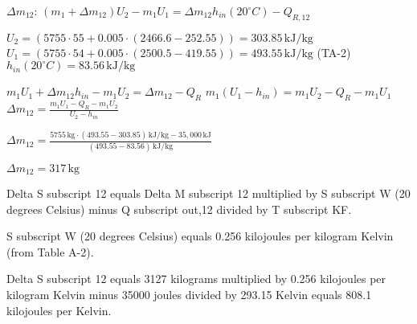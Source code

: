 \( \Delta m_{12} \):  
\((m_1 + \Delta m_{12}) U_2 - m_1 U_1 = \Delta m_{12} h_{in}(20^\circ C) - Q_{R,12}\)  

\( U_2 = (5755 \cdot 55 + 0.005 \cdot (2466.6 - 252.55)) = 303.85 \, \text{kJ/kg}\)  
\( U_1 = (5755 \cdot 54 + 0.005 \cdot (2500.5 - 419.55)) = 493.55 \, \text{kJ/kg}\) (TA-2)  
\( h_{in}(20^\circ C) = 83.56 \, \text{kJ/kg}\)  

\( m_1 U_1 + \Delta m_{12} h_{in} - m_1 U_2 = \Delta m_{12} - Q_{R}\)  
\( m_1 (U_1 - h_{in}) = m_1 U_2 - Q_{R} - m_1 U_1\)  
\( \Delta m_{12} = \frac{m_1 U_1 - Q_{R} - m_1 U_2}{U_2 - h_{in}}\)  

\(\Delta m_{12} = \frac{5755 \, \text{kg} \cdot (493.55 - 303.85) \, \text{kJ/kg} - 35,000 \, \text{kJ}}{(493.55 - 83.56) \, \text{kJ/kg}}\)  

\(\Delta m_{12} = 317 \, \text{kg}\)

Delta S subscript 12 equals Delta M subscript 12 multiplied by S subscript W (20 degrees Celsius) minus Q subscript out,12 divided by T subscript KF.  

S subscript W (20 degrees Celsius) equals 0.256 kilojoules per kilogram Kelvin (from Table A-2).  

Delta S subscript 12 equals 3127 kilograms multiplied by 0.256 kilojoules per kilogram Kelvin minus 35000 joules divided by 293.15 Kelvin equals 808.1 kilojoules per Kelvin.